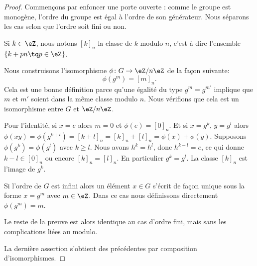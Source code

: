 \begin{proof}

	Commençons par enfoncer une porte ouverte : comme le groupe est monogène, l'ordre du groupe est égal à l'ordre de son générateur. Nous séparons les cas selon que l'ordre soit fini ou non.

	\begin{subproof}
		Si \( k\in\eZ\), nous notons \( [k]_n\) la classe de \( k\) modulo \( n\), c'est-à-dire l'ensemble \( \{ k+pn\tq p\in \eZ \}\).

		Nous construisons l'isomorphisme \( \phi\colon G\to \eZ/n\eZ\) de la façon suivante:
		\begin{equation}
			\phi(g^m)=[m]_n.
		\end{equation}
		Cela est une bonne définition parce qu'une égalité du type \( g^m=g^{m'}\) implique que \( m\) et \( m'\) soient dans la même classe modulo \( n\). Nous vérifions que cela est un isomorphisme entre \( G\) et \( \eZ/n\eZ\).

		\begin{subproof}
			\spitem[Morphisme]
			Pour l'identité, si \( x=e\) alors \( m=0\) et \( \phi(e)=[0]_n\). Et si \( x=g^k\), \( y=g^l\) alors \( \phi(xy)=\phi(g^{k+l})=[k+l]_n=[k]_n+[l]_n=\phi(x)+\phi(y) \).
			\spitem[Injectif]
			Supposons \( \phi(g^k)=\phi(g^l)\) avec \( k\geq l\). Nous avons \( h^k=h^l\), donc \( h^{k-l}=e\), ce qui donne \( k-l\in [0]_n\) ou encore \( [k]_n=[l]_n\). En particulier \( g^k=g^l\).
			\spitem[Surjectif]
			La classe \( [k]_n\) est l'image de \( g^k\).
		\end{subproof}


		Si l'ordre de \( G\) est infini alors un élément \( x\in G\) s'écrit de façon unique sous la forme \( x=g^m\) avec \( m\in \eZ\). Dans ce cas nous définissons directement \( \phi(g^m)=m\).

		Le reste de la preuve est alors identique au cas d'ordre fini, mais sans les complications liées au modulo.

	\end{subproof}

	La dernière assertion s'obtient des précédentes par composition d'isomorphismes.

\end{proof}

